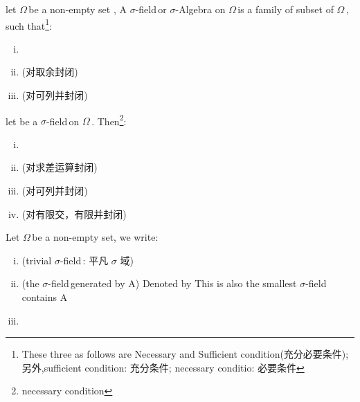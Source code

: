 \newcommand{\om}{\ensuremath{\Omega}\,}
\newcommand{\f}{\ensuremath{\sigma}-field\,}



\begin{definition}
let \om be a non-empty set , A \f or  $\sigma$-Algebra  on \om is a family
of subset of \om, such that\footnote[1]{These three as follows are Necessary and Sufficient condition(充分必要条件); 
另外,sufficient condition: 充分条件; necessary conditio: 必要条件}: 
\begin{enumerate}[(i)]
    \item {}
    \item {}\mbox{(对取余封闭)}
    \item {}\mbox{(对可列并封闭)}
\end{enumerate} 
\end{definition}

\remark let  be a \f on \om. Then\footnote[2]{necessary condition}:

\begin{enumerate}[(i)]
    \item {}
    \item {}(对求差运算封闭)
    \item {}(对可列并封闭)
    \item {}(对有限交，有限并封闭)
\end{enumerate}

Let \om be a non-empty set, we write:
\begin{enumerate}[(i)]
    \item  {} (trivial \f: 平凡 $\sigma$ 域)
    \item {} (the \f generated by A)
        \newline Denoted by 
        \newline This is also the smallest \f contains A
    \item {} 
\end{enumerate}

